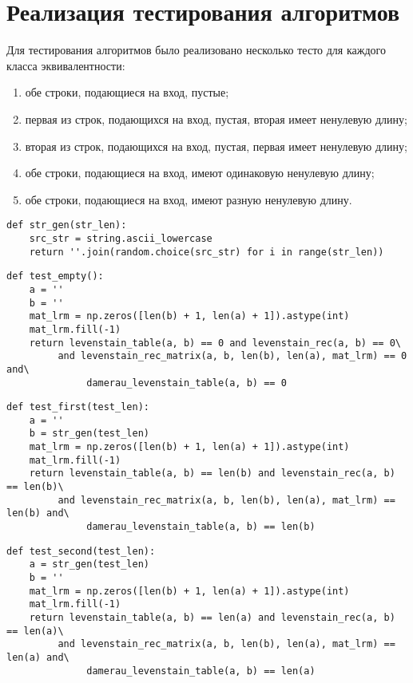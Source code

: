 \section{Реализация тестирования алгоритмов}

Для тестирования алгоритмов было реализовано несколько тесто для каждого класса эквивалентности:
\begin{enumerate}
	\item обе строки, подающиеся на вход, пустые;
	\item первая из строк, подающихся на вход, пустая, вторая имеет ненулевую длину;
	\item вторая из строк, подающихся на вход, пустая, первая имеет ненулевую длину;
	\item обе строки, подающиеся на вход, имеют одинаковую ненулевую длину;
	\item обе строки, подающиеся на вход, имеют разную ненулевую длину.
\end{enumerate}

\begin{lstlisting}[label=some-code-5,caption=Реализация функции рандомной генерации строк.]
def str_gen(str_len):
    src_str = string.ascii_lowercase
    return ''.join(random.choice(src_str) for i in range(str_len))

\end{lstlisting}

\begin{lstlisting}[label=some-code-6,caption=Реализация тестирования на пустых строках.]
def test_empty():
    a = ''
    b = ''
    mat_lrm = np.zeros([len(b) + 1, len(a) + 1]).astype(int)
    mat_lrm.fill(-1)
    return levenstain_table(a, b) == 0 and levenstain_rec(a, b) == 0\
         and levenstain_rec_matrix(a, b, len(b), len(a), mat_lrm) == 0 and\
              damerau_levenstain_table(a, b) == 0
\end{lstlisting}

\begin{lstlisting}[label=some-code-7,caption=Реализация тестирования первой пустой строки.]
def test_first(test_len):
    a = ''
    b = str_gen(test_len)
    mat_lrm = np.zeros([len(b) + 1, len(a) + 1]).astype(int)
    mat_lrm.fill(-1)
    return levenstain_table(a, b) == len(b) and levenstain_rec(a, b) == len(b)\
         and levenstain_rec_matrix(a, b, len(b), len(a), mat_lrm) == len(b) and\
              damerau_levenstain_table(a, b) == len(b)
\end{lstlisting}

\begin{lstlisting}[label=some-code-8,caption=Реализация тестирования второй пустой строки.]
def test_second(test_len):
    a = str_gen(test_len)
    b = ''
    mat_lrm = np.zeros([len(b) + 1, len(a) + 1]).astype(int)
    mat_lrm.fill(-1)
    return levenstain_table(a, b) == len(a) and levenstain_rec(a, b) == len(a)\
         and levenstain_rec_matrix(a, b, len(b), len(a), mat_lrm) == len(a) and\
              damerau_levenstain_table(a, b) == len(a)
\end{lstlisting}

